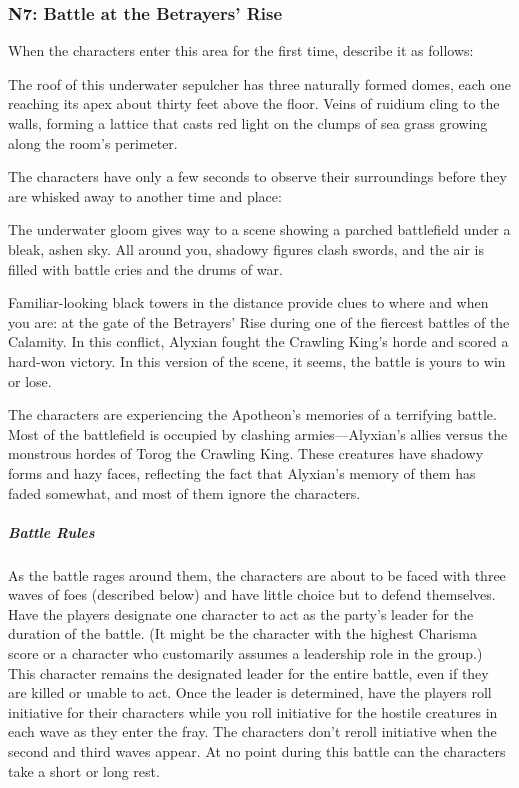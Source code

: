 \documentclass[10pt,a4paper,twoside,fancy,bg=print,twocolumn,openany,nodeprecatedcode]{dndbook}
\begin{document}
\subsubsection{N7: Battle at the Betrayers' Rise}
When the characters enter this area for the first time, describe it as follows:

\begin{DndReadAloud}{}
The roof of this underwater sepulcher has three naturally formed domes, each one reaching its apex about thirty feet above the floor. Veins of ruidium cling to the walls, forming a lattice that casts red light on the clumps of sea grass growing along the room's perimeter.

\end{DndReadAloud}

The characters have only a few seconds to observe their surroundings before they are whisked away to another time and place:

\begin{DndReadAloud}{}
The underwater gloom gives way to a scene showing a parched battlefield under a bleak, ashen sky. All around you, shadowy figures clash swords, and the air is filled with battle cries and the drums of war.

Familiar-looking black towers in the distance provide clues to where and when you are: at the gate of the Betrayers' Rise during one of the fiercest battles of the Calamity. In this conflict, Alyxian fought the Crawling King's horde and scored a hard-won victory. In this version of the scene, it seems, the battle is yours to win or lose.

\end{DndReadAloud}

The characters are experiencing the Apotheon's memories of a terrifying battle. Most of the battlefield is occupied by clashing armies—Alyxian's allies versus the monstrous hordes of Torog the Crawling King. These creatures have shadowy forms and hazy faces, reflecting the fact that Alyxian's memory of them has faded somewhat, and most of them ignore the characters.

\subparagraph{Battle Rules}
As the battle rages around them, the characters are about to be faced with three waves of foes (described below) and have little choice but to defend themselves. Have the players designate one character to act as the party's leader for the duration of the battle. (It might be the character with the highest Charisma score or a character who customarily assumes a leadership role in the group.) This character remains the designated leader for the entire battle, even if they are killed or unable to act. Once the leader is determined, have the players roll initiative for their characters while you roll initiative for the hostile creatures in each wave as they enter the fray. The characters don't reroll initiative when the second and third waves appear. At no point during this battle can the characters take a short or long rest.
\end{document}
